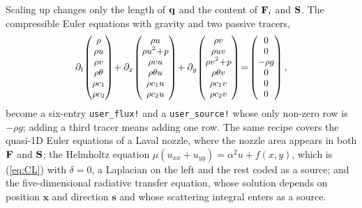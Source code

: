 \documentclass[10pt,onecolumn]{article}
\begin{document}
\noindent
Scaling up changes only the length of $\bf q$ and the content of ${\bf F}_i$ and
$\bf S$. The compressible Euler equations with gravity and two passive tracers,
\begin{equation}
\label{eq:euler}
\small
\partial_t\!
\begin{pmatrix}\rho\\ \rho u\\ \rho v\\ \rho\theta\\ \rho c_1\\ \rho c_2\end{pmatrix}
\!+\partial_x\!
\begin{pmatrix}\rho u\\ \rho u^2\!+\!p\\ \rho vu\\ \rho\theta u\\ \rho c_1u\\ \rho c_2u\end{pmatrix}
\!+\partial_y\!
\begin{pmatrix}\rho v\\ \rho uv\\ \rho v^2\!+\!p\\ \rho\theta v\\ \rho c_1v\\ \rho c_2v\end{pmatrix}
\!=\!
\begin{pmatrix}0\\ 0\\ -\rho g\\ 0\\ 0\\ 0\end{pmatrix},
\end{equation}
become a six-entry \texttt{user\_flux!} and a \texttt{user\_source!} whose only
non-zero row is $-\rho g$; adding a third tracer means adding one row. The same
recipe covers the quasi-1D Euler equations of a Laval nozzle, where the nozzle
area appears in both $\bf F$ and $\bf S$; the Helmholtz equation
$\mu(u_{xx}+u_{yy}) = \alpha^2u + f(x,y)$, which is (\ref{eq:CL}) with
$\delta = 0$, a Laplacian on the left and the rest coded as a source; and the
five-dimensional radiative transfer equation, whose solution depends on position
$\mathbf{x}$ and direction $\mathbf{s}$ and whose scattering integral enters as
a source.
\end{document}
